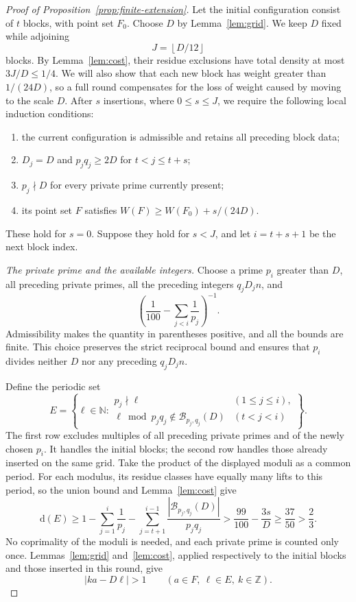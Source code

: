 \documentclass[11pt,reqno]{amsart}
\theoremstyle{definition}
\theoremstyle{remark}
\numberwithin{equation}{section}
\newcommand{\N}{\mathbb N}
\newcommand{\Z}{\mathbb Z}
\newcommand{\dens}{\mathrm d}
\begin{document}
\begin{proof}[Proof of Proposition~\ref{prop:finite-extension}]
Let the initial configuration consist of $t$ blocks, with point set
$F_0$. Choose $D$ by Lemma~\ref{lem:grid}. We keep $D$ fixed while adjoining
\[
 J=\left\lfloor D/12\right\rfloor
\]
blocks. By Lemma~\ref{lem:cost}, their residue exclusions have total
density at most $3J/D\leq1/4$. We will also show that each new block
has weight greater than $1/(24D)$, so a full round compensates for the
loss of weight caused by moving to the scale $D$.
After $s$ insertions, where $0\leq s\leq J$, we require the following
local induction conditions:
\begin{enumerate}
\item the current configuration is admissible and retains all preceding
block data;
\item $D_j=D$ and $p_jq_j\geq2D$ for $t<j\leq t+s$;
\item $p_j\nmid D$ for every private prime currently present;
\item its point set $F$ satisfies
$W(F)\geq W(F_0)+s/(24D)$.
\end{enumerate}
These hold for $s=0$. Suppose they hold for $s<J$, and let $i=t+s+1$
be the next block index.

\smallskip
\noindent\emph{The private prime and the available integers.}
Choose a prime $p_i$ greater than $D$, all preceding private primes,
all the preceding integers $q_jD_jn$, and
\[
 \left(\frac1{100}-\sum_{j<i}\frac1{p_j}\right)^{-1}.
\]
Admissibility makes the quantity in parentheses positive, and all the
bounds are finite. This choice preserves the strict reciprocal bound and ensures
that $p_i$ divides neither $D$ nor any preceding $q_jD_jn$.

Define the periodic set
\begin{equation}\label{eq:round-filter}
 E=\left\{\ell\in\N:
 \begin{array}{ll}
 p_j\nmid\ell & (1\leq j\leq i),\\
 \ell\bmod p_jq_j\notin\mathcal B_{p_j,q_j}(D)
     & (t<j<i)
 \end{array}\right\}.
\end{equation}
The first row excludes multiples of all preceding private primes and
of the newly chosen $p_i$. It handles the initial blocks; the second
row handles those already inserted on the same grid.
Take the product of the displayed moduli as a common period. For each
modulus, its residue classes have equally many lifts to this period,
so the union bound and Lemma~\ref{lem:cost} give
\begin{equation}\label{eq:round-density}
 \dens(E)\geq1-\sum_{j=1}^i\frac1{p_j}
       -\sum_{j=t+1}^{i-1}
           \frac{|\mathcal B_{p_j,q_j}(D)|}{p_jq_j}
 >\frac{99}{100}-\frac{3s}{D}
 \geq\frac{37}{50}>\frac23.
\end{equation}
No coprimality of the moduli is needed, and each private prime is counted
only once. Lemmas~\ref{lem:grid} and~\ref{lem:cost}, applied respectively
to the initial blocks and those inserted in this round, give
\begin{equation}\label{eq:unperturbed-separation}
 |ka-D\ell|>1\qquad(a\in F,\ \ell\in E,\ k\in\Z).
\end{equation}


\end{proof}
\end{document}
